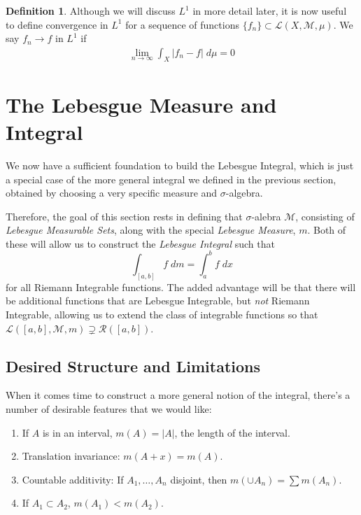 \documentclass[12pt]{article}
\theoremstyle{plain}
\theoremstyle{definition}
\newtheorem{defn}[thm]{Definition}
\theoremstyle{remark}
\begin{document}
\begin{defn}
    Although we will discuss $L^1$ in more detail later, it is now useful to define convergence in $L^1$ for a sequence of functions $\{f_n\}\subset\mathscr{L}(X,\mathscr{M},\mu)$. We say $f_n \rightarrow f$ in $L^1$ if 
\begin{align*}
    \lim_{n\rightarrow\infty} \int_X |f_n-f| \; d\mu
    = 0
\end{align*}
\end{defn}




\newpage
\section{The Lebesgue Measure and Integral}

We now have a sufficient foundation to build the Lebesgue Integral, which is just a special case of the more general integral we defined in the previous section, obtained by choosing a very specific measure and $\sigma$-algebra.

Therefore, the goal of this section rests in defining that $\sigma$-alebra $\mathscr{M}$, consisting of \emph{Lebesgue Measurable Sets}, along with the special \emph{Lebesgue Measure}, $m$. Both of these will allow us to construct the \emph{Lebesgue Integral} such that
\[
    \int_{[a,b]} f \; dm = \int_a^b f \; dx
\]
for all Riemann Integrable functions. The added advantage will be that there will be additional functions that are Lebesgue Integrable, but \emph{not} Riemann Integrable, allowing us to extend the class of integrable functions so that $\mathscr{L}([a,b],\mathscr{M},m) \supsetneq \mathscr{R}([a,b])$.


\subsection{Desired Structure and Limitations}

When it comes time to construct a more general notion of the integral, there's a number of desirable features that we would like:
\begin{enumerate}
    \item If $A$ is in an interval, $m(A) = |A|$, the length of the interval.
    \item Translation invariance: $m(A+x) = m(A)$.
    \item Countable additivity: If $A_1, \ldots, A_n$ disjoint, then $m(\cup A_n) = \sum m(A_n)$. 
    \item If $A_1 \subset A_2$, $m(A_1) < m(A_2)$.
\end{enumerate}
\end{document}
